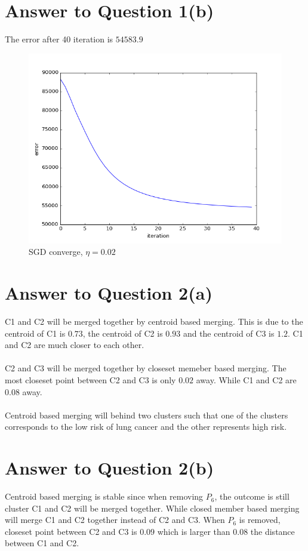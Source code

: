\documentclass[11pt]{article}
\begin{document}
\section*{Answer to Question 1(b)}
The error after 40 iteration is $54583.9$
\begin{figure}[h]
\center
\includegraphics[scale=0.7]{iteration.png}
\caption{SGD converge, $\eta = 0.02$}
\end{figure}


\pagebreak[4]
\section*{Answer to Question 2(a)}
C1 and C2 will be merged together by centroid based merging.
This is due to the centroid of C1 is $0.73$,
the centroid of C2 is $0.93$ and the centroid of C3 is $1.2$.
C1 and C2 are much closer to each other.\\
\\
C2 and C3 will be merged together by closeset memeber based merging.
The most closeset point between C2 and C3 is only $0.02$ away. While C1 and C2 are $0.08$ away.\\
\\
Centroid based merging will behind two clusters
such that one of the clusters corresponds to the low risk of lung cancer and the other represents high risk.

\pagebreak[4]
\section*{Answer to Question 2(b)}
Centroid based merging is stable since when removing $P_6$, the outcome is still cluster C1 and C2 will be merged together.
While closed member based merging will merge C1 and C2 together instead of C2 and C3.
When $P_6$ is removed, closeset point between C2 and C3 is $0.09$ which is larger than $0.08$ the distance between C1 and C2.
\end{document}

